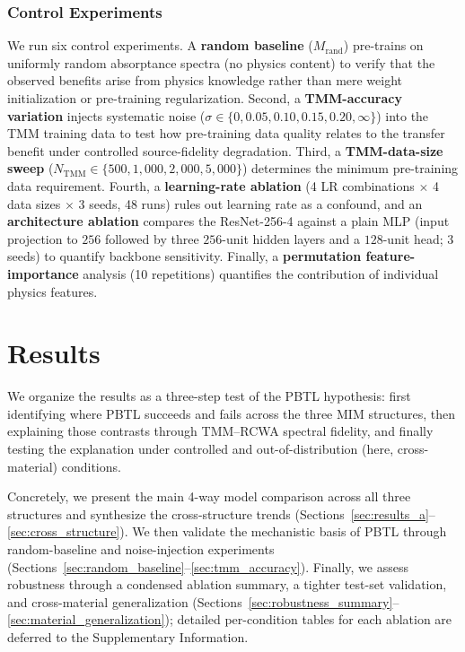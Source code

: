 \documentclass[a4paper,fleqn]{cas-sc}
\newcommand{\Mrand}{M_\text{rand}}
\begin{document}
\subsubsection{Control Experiments}

We run six control experiments. A \textbf{random baseline} ($\Mrand$) pre-trains on uniformly random absorptance spectra (no physics content) to verify that the observed benefits arise from physics knowledge rather than mere weight initialization or pre-training regularization. Second, a \textbf{TMM-accuracy variation} injects systematic noise ($\sigma \in \{0, 0.05, 0.10, 0.15, 0.20, \infty\}$) into the TMM training data to test how pre-training data quality relates to the transfer benefit under controlled source-fidelity degradation. Third, a \textbf{TMM-data-size sweep} ($N_\text{TMM} \in \{500, 1{,}000, 2{,}000, 5{,}000\}$) determines the minimum pre-training data requirement. Fourth, a \textbf{learning-rate ablation} (4 LR combinations $\times$ 4 data sizes $\times$ 3 seeds, 48 runs) rules out learning rate as a confound, and an \textbf{architecture ablation} compares the ResNet-256-4 against a plain MLP (input projection to $256$ followed by three $256$-unit hidden layers and a $128$-unit head; 3 seeds) to quantify backbone sensitivity. Finally, a \textbf{permutation feature-importance} analysis (10 repetitions) quantifies the contribution of individual physics features.


\section{Results}
\label{sec:results}

We organize the results as a three-step test of the PBTL hypothesis: first identifying where PBTL succeeds and fails across the three MIM structures, then explaining those contrasts through TMM--RCWA spectral fidelity, and finally testing the explanation under controlled and out-of-distribution (here, cross-material) conditions.

Concretely, we present the main 4-way model comparison across all three structures and synthesize the cross-structure trends (Sections~\ref{sec:results_a}--\ref{sec:cross_structure}). We then validate the mechanistic basis of PBTL through random-baseline and noise-injection experiments (Sections~\ref{sec:random_baseline}--\ref{sec:tmm_accuracy}). Finally, we assess robustness through a condensed ablation summary, a tighter test-set validation, and cross-material generalization (Sections~\ref{sec:robustness_summary}--\ref{sec:material_generalization}); detailed per-condition tables for each ablation are deferred to the Supplementary Information.
\end{document}
